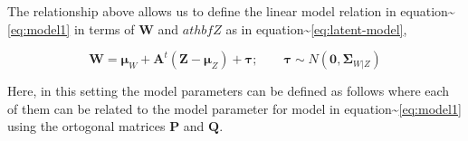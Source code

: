 \documentclass[12pt,a4paperpaper,authoryear]{elsarticle} %
\begin{document}
The relationship above allows us to define the linear model relation in
equation\textasciitilde{}\eqref{eq:model1} in terms of \(\mathbf{W}\) and
\(athbf{Z}\) as in equation\textasciitilde{}\eqref{eq:latent-model},

\begin{equation}
  \mathbf{W} =  \boldsymbol{\mu}_W + \mathbf{A}^t \left(\mathbf{Z} - \boldsymbol{\mu}_Z\right) + \boldsymbol{\tau}; \qquad
  \boldsymbol{\tau} \sim N\left(\mathbf{0}, \boldsymbol{\Sigma}_{W|Z}\right)
  \label{eq:latent-model}
\end{equation}

Here, in this setting the model parameters can be defined as follows
where each of them can be related to the model parameter for model in
equation\textasciitilde{}\eqref{eq:model1} using the ortogonal matrices
\(\mathbf{P}\) and \(\mathbf{Q}\).
\end{document}
